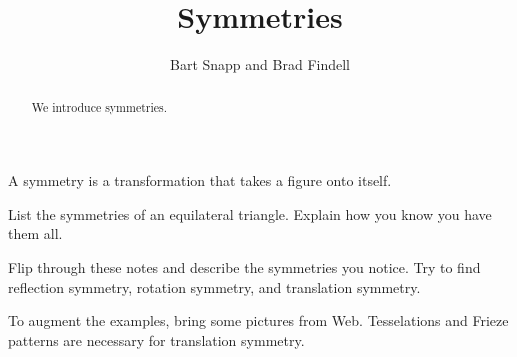 \documentclass[nooutcomes]{ximera}
\title{Symmetries}
\author{Bart Snapp and Brad Findell}
\begin{document}
\begin{abstract}
  We introduce symmetries.
\end{abstract}
\maketitle

\begin{teachingnote}
\end{teachingnote}

\begin{definition}
A symmetry is a transformation that takes a figure onto itself.  
\end{definition}
\begin{problem}
List the symmetries of an equilateral triangle.  Explain how you know you have them all.  
\end{problem}

\begin{problem}
Flip through these notes and describe the symmetries you notice.  Try to find reflection symmetry, rotation symmetry, and translation symmetry.  
\end{problem}

\begin{teachingnote}
To augment the examples, bring some pictures from Web.   Tesselations and Frieze patterns are necessary for translation symmetry.  
\end{teachingnote}
\end{document}
